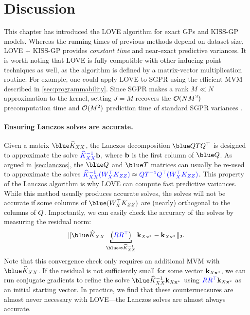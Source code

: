 \section{Discussion}
\label{sec:love_discussion}

This chapter has introduced the LOVE algorithm for exact GPs and KISS-GP models.
Whereas the running times of previous methods depend on dataset size, LOVE{} + KISS-GP provides \emph{constant time} and near-exact predictive variances.
It is worth noting that LOVE is fully compatible with other inducing point techniques as well, as the algorithm is defined by a matrix-vector multiplication routine.
For example, one could apply LOVE to SGPR using the efficient MVM described in \cref{sec:programmability}.
Since SGPR makes a rank $M \ll N$ approximation to the kernel, setting $J\!=\!M$ recovers the $\bigo{NM^{2}}$ precomputation time and $\bigo{M^2}$ prediction time of standard SGPR variances \cite{titsias2009variational}.

\paragraph{Ensuring Lanczos solves are accurate.}
Given a matrix $\blue \trainK$, the Lanczos decomposition $\blue \bQ \bT \bQ^\top$ is designed to approximate the solve ${\color{blue} \widehat{K}_{XX}^{-1}} \mathbf{b}$, where $\mathbf{b}$ is the first column of $\blue \bQ$.
As argued in \cref{sec:lanczos}, the $\blue \bQ$ and $\blue \bT$ matrices can usually be re-used to approximate the solves ${\color{blue} \widehat {K}_{XX}^{-1} (W_{X}^\top K_{ZZ})} \approx {\color{blue} \ensuremath{Q}\ensuremath{T}^{-1} \ensuremath{Q}^\top (\ensuremath{W}_{\ensuremath{X}}^\top \ensuremath{K}_{\ensuremath{Z}\ensuremath{Z}})}$.
This property of the Lanczos algorithm is why LOVE{} can compute fast predictive variances.
While this method usually produces accurate solves, the solves will not be accurate if some columns of $\blue (\bW^\top_{\bX} \bK_{\bZ\bZ})$ are (nearly) orthogonal to the columns of $Q$.
Importantly, we can easily check the accuracy of the solves by measuring the residual norm:
%
\[
  \Vert {\blue \trainK} \underbracket{\left( {\color{blue} \bR \bR^\top} \right)}_{\blue \approx \trainK^{-1}} \bk_{\bX \bxtest} - \bk_{\bX \bxtest} \Vert_2.
\]
%
Note that this convergence check only requires an additional MVM with $\blue \trainK$.
If the residual is not sufficiently small for some vector $\mathbf{k}_{X \mathbf{x}^*}$, we can run conjugate gradients to refine the solve ${\blue \trainK^{-1}} \bk_{\bX \bxtest}$ using ${\color{blue} R R^\top} \mathbf{k}_{X \mathbf{x}^*}$ as an initial starting vector.
In practice, we find that these countermeasures are almost never necessary with LOVE{}---the Lanczos solves are almost always accurate.

